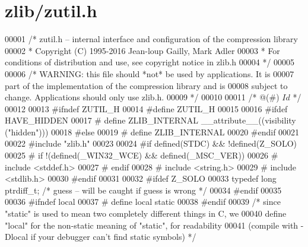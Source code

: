 \hypertarget{zlib_2zutil_8h_source}{}\section{zlib/zutil.h}
\label{zlib_2zutil_8h_source}

\begin{DoxyCode}
00001 \textcolor{comment}{/* zutil.h -- internal interface and configuration of the compression library}
00002 \textcolor{comment}{ * Copyright (C) 1995-2016 Jean-loup Gailly, Mark Adler}
00003 \textcolor{comment}{ * For conditions of distribution and use, see copyright notice in zlib.h}
00004 \textcolor{comment}{ */}
00005 
00006 \textcolor{comment}{/* WARNING: this file should *not* be used by applications. It is}
00007 \textcolor{comment}{   part of the implementation of the compression library and is}
00008 \textcolor{comment}{   subject to change. Applications should only use zlib.h.}
00009 \textcolor{comment}{ */}
00010 
00011 \textcolor{comment}{/* @(#) $Id$ */}
00012 
00013 \textcolor{preprocessor}{#ifndef ZUTIL\_H}
00014 \textcolor{preprocessor}{#define ZUTIL\_H}
00015 
00016 \textcolor{preprocessor}{#ifdef HAVE\_HIDDEN}
00017 \textcolor{preprocessor}{#  define ZLIB\_INTERNAL \_\_attribute\_\_((visibility ("hidden")))}
00018 \textcolor{preprocessor}{#else}
00019 \textcolor{preprocessor}{#  define ZLIB\_INTERNAL}
00020 \textcolor{preprocessor}{#endif}
00021 
00022 \textcolor{preprocessor}{#include "zlib.h"}
00023 
00024 \textcolor{preprocessor}{#if defined(STDC) && !defined(Z\_SOLO)}
00025 \textcolor{preprocessor}{#  if !(defined(\_WIN32\_WCE) && defined(\_MSC\_VER))}
00026 \textcolor{preprocessor}{#    include <stddef.h>}
00027 \textcolor{preprocessor}{#  endif}
00028 \textcolor{preprocessor}{#  include <string.h>}
00029 \textcolor{preprocessor}{#  include <stdlib.h>}
00030 \textcolor{preprocessor}{#endif}
00031 
00032 \textcolor{preprocessor}{#ifdef Z\_SOLO}
00033    \textcolor{keyword}{typedef} \textcolor{keywordtype}{long} ptrdiff\_t;  \textcolor{comment}{/* guess -- will be caught if guess is wrong */}
00034 \textcolor{preprocessor}{#endif}
00035 
00036 \textcolor{preprocessor}{#ifndef local}
00037 \textcolor{preprocessor}{#  define local static}
00038 \textcolor{preprocessor}{#endif}
00039 \textcolor{comment}{/* since "static" is used to mean two completely different things in C, we}
00040 \textcolor{comment}{   define "local" for the non-static meaning of "static", for readability}
00041 \textcolor{comment}{   (compile with -Dlocal if your debugger can't find static symbols) */}

\end{DoxyCode}
